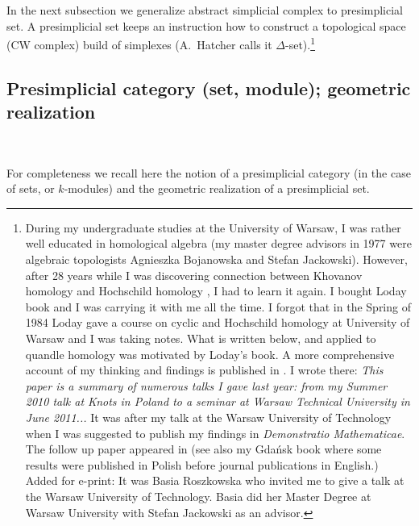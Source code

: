 \documentclass[12pt]{amsart}
\begin{document}
In the next subsection we generalize abstract simplicial complex to presimplicial set.
A presimplicial set keeps an instruction how to construct a topological space (CW complex) build of simplexes (A.~Hatcher \cite{Hat} calls it $\Delta$-set).\footnote{
During my undergraduate studies at the University of Warsaw, I was rather well educated in homological algebra (my master degree advisors in 1977 were algebraic topologists Agnieszka Bojanowska and Stefan Jackowski).
However, after 28 years while I was discovering connection between Khovanov homology and Hochschild homology \cite{Prz7}, I had to learn it again. I bought Loday book \cite{Lod} and I was carrying it with me all the time. I forgot that in the Spring of 1984 Loday gave a course on cyclic and Hochschild homology at University of Warsaw and I was taking notes. What is written below, and applied to quandle homology was motivated by Loday's book. A more comprehensive account of my thinking and findings is published in \cite{Prz8}. I wrote there: {\it This paper is a summary of numerous talks I gave last year: from my Summer 2010 talk at Knots in Poland to a seminar at Warsaw Technical University in June 2011...} It was after my talk at the Warsaw University of Technology when I was suggested to publish my findings in \emph{Demonstratio Mathematicae}. The follow up paper appeared in \cite{Prz11} (see also my Gda\'nsk book \cite{Prz9} where some results were published in Polish before journal publications in English.) {\color{red} Added for e-print: It was Basia Roszkowska who invited me to give a talk at} {\color{red} the Warsaw University of Technology. Basia did her Master Degree at Warsaw University with Stefan Jackowski as an advisor.}}

\subsection{Presimplicial category (set, module); geometric realization}\ 

For completeness we recall here the notion of a presimplicial category (in the case of sets, or $k$-modules) and the geometric realization of a presimplicial set.
\end{document}

